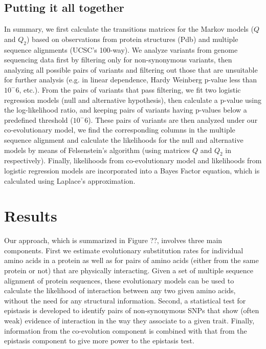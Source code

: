 \subsection{Putting it all together}

In summary, we first calculate the transitions matrices for the Markov models ($Q$ and $Q_2$) based on observations from protein structures (Pdb) and multiple sequence alignments (UCSC's 100-way). We analyze variants from genome sequencing data first by filtering only for non-synonymous variants, then analyzing all possible pairs of variants and filtering out those that are unsuitable for further analysis (e.g. in linear dependence, Hardy Weinberg p-value less than $10^-6$, etc.). From the pairs of variants that pass filtering, we fit two logistic regression models (null and alternative hypothesis), then calculate a p-value using the log-likelihood ratio, and keeping pairs of variants having p-values below a predefined threshold ($10^-6$). These pairs of variants are then analyzed under our co-evolutionary model, we find the corresponding columns in the multiple sequence alignment and calculate the likelihoods for the null and alternative models by means of Felsenstein's algorithm (using matrices $Q$ and $Q_2$ in respectively). Finally, likelihoods from co-evolutionary model and likelihoods from logistic regression models are incorporated into a Bayes Factor equation, which is calculated using Laplace's approximation.

\section{Results}

Our approach, which is summarized in Figure ??, involves three main components. First we estimate evolutionary substitution rates for individual amino acids in a protein as well as for pairs of amino acids (either from the same protein or not) that are physically interacting. Given a set of multiple sequence alignment of protein sequences, these evolutionary models can be used to calculate the likelihood of interaction between any two given amino acids, without the need for any structural information. Second, a statistical test for epistasis is developed to identify pairs of non-synonymous SNPs that show (often weak) evidence of interaction in the way they associate to a given trait. Finally, information from the co-evolution component is combined with that from the epistasis component to give more power to the epistasis test.
 
